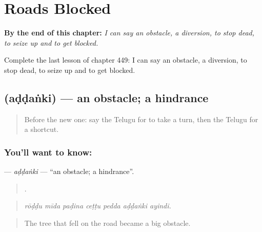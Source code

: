 
\chapter{Roads Blocked}
\label{ch:te-roads-blocked}

\begin{chapteropening}
\textbf{By the end of this chapter:} \emph{I can say an obstacle, a diversion, to stop dead, to seize up and to get blocked.}

Complete the last lesson of chapter 449: I can say an obstacle, a diversion, to stop dead, to seize up and to get blocked.
\end{chapteropening}

\section[\texorpdfstring{\te{అడ్డంకి} (aḍḍaṅki)}{అడ్డంకి (aḍḍaṅki)}]{ (aḍḍaṅki) — an obstacle; a hindrance}

\label{lesson:TE-C449-addanki}



\begin{quote}
Before the new one: say the Telugu for to take a turn, then the Telugu for a shortcut.
\end{quote}

\subsection*{You'll want to know: }
\textbf{} — \emph{aḍḍaṅki} — \textquotedblleft{}an obstacle; a hindrance\textquotedblright{}.

\begin{quote}
      .
\end{quote}

\begin{quote}
\emph{rōḍḍu mīda paḍina ceṭṭu pedda aḍḍaṅki ayindi.}
\end{quote}

\begin{quote}
The tree that fell on the road became a big obstacle.
\end{quote}

